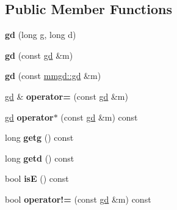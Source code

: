 \subsection*{Public Member Functions}
\begin{DoxyCompactItemize}
\item 
\mbox{\label{classetvo_i_i_1_1gd_a907834f286d3b6776280c0daea369825}} 
{\bfseries gd} (long g, long d)
\item 
\mbox{\label{classetvo_i_i_1_1gd_a2ba6a8a668b49c1a0d9ec743f6fb26c2}} 
{\bfseries gd} (const \mbox{\hyperlink{classetvo_i_i_1_1gd}{gd}} \&m)
\item 
\mbox{\label{classetvo_i_i_1_1gd_a2af50d7ca46f7909f52e655f4c447a8a}} 
{\bfseries gd} (const \mbox{\hyperlink{classmmgd_1_1gd}{mmgd\+::gd}} \&m)
\item 
\mbox{\label{classetvo_i_i_1_1gd_a7d667d50b7d853d4cb6f7479e28e5b91}} 
\mbox{\hyperlink{classetvo_i_i_1_1gd}{gd}} \& {\bfseries operator=} (const \mbox{\hyperlink{classetvo_i_i_1_1gd}{gd}} \&m)
\item 
\mbox{\label{classetvo_i_i_1_1gd_a7590f56c2e1d7e196435b685461a1dfc}} 
\mbox{\hyperlink{classetvo_i_i_1_1gd}{gd}} {\bfseries operator$\ast$} (const \mbox{\hyperlink{classetvo_i_i_1_1gd}{gd}} \&m) const
\item 
\mbox{\label{classetvo_i_i_1_1gd_a856c302bde775d83ae8960e4fb05f423}} 
long {\bfseries getg} () const
\item 
\mbox{\label{classetvo_i_i_1_1gd_a47b2511afe2e3a1bab94a516c5e524dd}} 
long {\bfseries getd} () const
\item 
\mbox{\label{classetvo_i_i_1_1gd_a35dfa6812456c575b46682633e4c08f9}} 
bool {\bfseries isE} () const
\item 
\mbox{\label{classetvo_i_i_1_1gd_ad736e42b2f93eecfd2178ff489cabb0a}} 
bool {\bfseries operator!=} (const \mbox{\hyperlink{classetvo_i_i_1_1gd}{gd}} \&m) const
\item 
\mbox{\label{classetvo_i_i_1_1gd_a8725b56848f17a58154ebaa0b407a4f7}} 

\end{DoxyCompactItemize}
